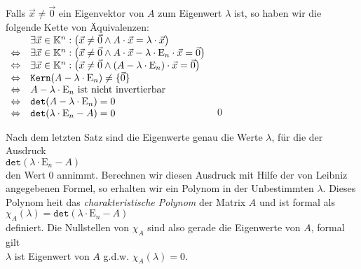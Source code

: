 \proof
Falls $\vec{x} \not= \vec{0}$ ein Eigenvektor von $A$ zum Eigenwert $\lambda$ ist, so haben wir die folgende
Kette von \"Aquivalenzen:
\\[0.2cm]
\hspace*{1.3cm}
$
\begin{array}[b]{lll}
                  & \exists \vec{x} \in \mathbb{K}^n: \bigl(\vec{x} \not=\vec{0} \wedge A \cdot \vec{x}  = \lambda \cdot \vec{x}\bigr) \\
\Leftrightarrow   & \exists \vec{x} \in \mathbb{K}^n: \bigl(\vec{x} \not=\vec{0} \wedge A \cdot \vec{x} - \lambda \cdot \mathrm{E}_n \cdot \vec{x} = \vec{0}\bigr) \\
\Leftrightarrow   & \exists \vec{x} \in \mathbb{K}^n: \bigl(\vec{x} \not=\vec{0} \wedge (A - \lambda \cdot \mathrm{E}_n) \cdot \vec{x} = \vec{0}\bigr) \\
\Leftrightarrow   & \mathtt{Kern}(A - \lambda \cdot \mathrm{E}_n) \not= \{\vec{0}\} \\
\Leftrightarrow   & \mbox{$A - \lambda \cdot \mathrm{E}_n$ ist nicht invertierbar} \\
\Leftrightarrow   & \mathtt{det}(A - \lambda \cdot \mathrm{E}_n) = 0  \\
\Leftrightarrow   & \mathtt{det}(\lambda \cdot \mathrm{E}_n - A) = 0  
\end{array}
$
\qed

Nach dem letzten Satz sind die Eigenwerte genau die Werte $\lambda$, f\"ur die der Ausdruck 
\\[0.2cm]
\hspace*{1.3cm}
 $\mathtt{det}(\lambda \cdot \mathrm{E}_n- A)$
\\[0.2cm]
den Wert $0$ annimmt.  Berechnen wir diesen Ausdruck mit Hilfe der von Leibniz angegebenen Formel,
so erhalten wir ein Polynom in der Unbestimmten $\lambda$.  Dieses Polynom hei\3t das
{\emph{\color{blue}charakteristische Polynom}} der Matrix $A$ und ist formal als
\\[0.2cm]
\hspace*{1.3cm}
$\chi_A(\lambda) = \mathtt{det}(\lambda \cdot \mathrm{E}_n - A)$
\\[0.2cm]
definiert.  Die Nullstellen von $\chi_A$ sind also gerade die Eigenwerte von $A$, formal gilt
\\[0.2cm]
\hspace*{1.3cm}
$\lambda$ ist Eigenwert von $A$ \quad g.d.w. \quad $\chi_A(\lambda) = 0$.



